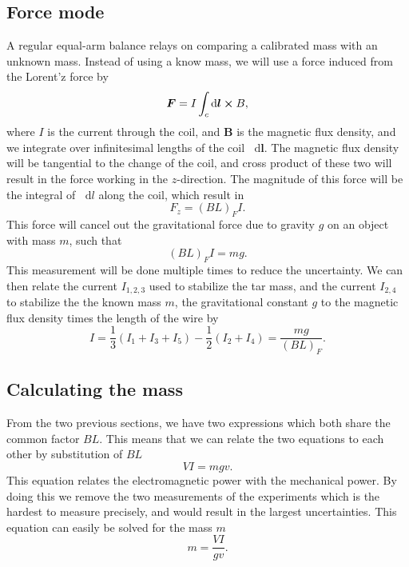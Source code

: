 \documentclass[english,a4paper,12pt,reprint]{revtex4-1}
\newcommand*\diff{\mathop{}\!\mathrm{d}}
\begin{document}
\subsection{Force mode}
A regular equal-arm balance relays on comparing a calibrated mass with an unknown mass. Instead of using a know mass, we will use a force induced from the Lorent'z force by
\begin{equation}
    \bm{F} = I\int_c \diff \bm{l}\cross B, \label{lorentz_force1}
\end{equation}
where $I$ is the current through the coil, and $\bm{B}$ is the magnetic flux density, and we integrate over infinitesimal lengths of the coil $\diff \bm{l}$. The magnetic flux density will be tangential to the change of the coil, and cross product of these two will result in the force working in the $z$-direction. The magnitude of this force will be the integral of $\diff l$ along the coil, which result in
\begin{equation} \label{force_mode_force}
    F_z = \left(BL\right)_FI.
\end{equation}
This force will cancel out the gravitational force due to gravity $g$ on an object with mass $m$, such that
\begin{equation}
    \left(BL\right)_FI = mg. \label{mechanical}
\end{equation}
This measurement will be done multiple times to reduce the uncertainty. We can then relate the current $I_{1,2,3}$ used to stabilize the tar mass, and the current $I_{2,4}$ to stabilize the the known mass $m$, the gravitational constant $g$ to the magnetic flux density times the length of the wire by
\begin{equation}
    I = \frac{1}{3}\left(I_1 + I_3 + I_5\right) - \frac{1}{2}\left(I_2 + I_4\right) = \frac{mg}{\left(BL\right)_F}. \label{multiple_measur}
\end{equation}

\subsection{Calculating the mass}
From the two previous sections, we have two expressions which both share the common factor $BL$. This means that we can relate the two equations to each other by substitution of $BL$
\begin{equation}
    VI = mgv.
\end{equation}
This equation relates the electromagnetic power with the  mechanical power. By doing this we remove the two measurements of the experiments which is the hardest to measure precisely, and would result in the largest uncertainties. This equation can easily be solved for the mass $m$
\begin{equation}
    m = \frac{VI}{gv}.\label{mass}
\end{equation}
\\
\end{document}
